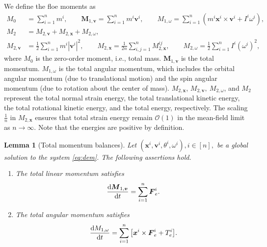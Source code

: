 \documentclass[a4paper,11pt]{article}
\numberwithin{equation}{section}
\newtheorem{lemma}[theorem]{Lemma}
\theoremstyle{definition}
\newcommand{\bfx}{\boldsymbol{x}}
\newcommand{\bfv}{\boldsymbol{v}}
\newcommand{\bfF}{\boldsymbol{F}}
\newcommand{\bfM}{\boldsymbol{M}}
\def\d{{  \rm d}}
\begin{document}
\noindent
We define the floe moments as
\begin{equation} \label{eq:Ms}
\begin{aligned}
    M_0 & = \sum_{i=1}^n m^i, \qquad \bfM_{1,\bfv} = \sum_{i=1}^n m^i \bfv^i, 
    \qquad M_{1,\omega} = \sum_{i=1}^n (m^i \bfx^i \times \bfv^i + I^i \omega^i), \\
    M_2 & = M_{2,\bfv} + M_{2,\bfx} + M_{2,\omega}, \\
    M_{2,\bfv} &= \frac{1}{2} \sum_{i=1}^n m^i | \bfv^i|^2, \qquad M_{2,\bfx} = \frac{1}{2n}\sum_{i,j=1}^n M_{2,\bfx}^{ij}, \qquad    M_{2,\omega}  = \frac{1}{2} \sum_{i=1}^n I^i (\omega^i)^2,
    \end{aligned}
\end{equation}
where $M_0$ is the zero-order moment, i.e., total mass. 
$\bfM_{1,\bfv} $ is the total momentum.
$M_{1,\omega}$ is the total angular momentum, which includes the orbital angular momentum (due to translational motion) and the spin angular momentum (due to rotation about the center of mass). 
$M_{2,\bfx}$,  $M_{2,\bfv},\ M_{2,\omega}$, and  $M_2$ represent the total normal strain energy, the total translational kinetic energy, the total rotational kinetic energy, and the total energy, respectively. 
The scaling $\frac{1}{n}$ in $M_{2,\bfx}$ ensures that total strain energy remain $\mathcal{O}(1)$ in the mean-field limit as $n\to \infty.$
Note that the energies are positive by definition.


\begin{lemma}[Total momentum balances] \label{lem:sumparticleMV}
Let $(\bfx^i, \bfv^i, \theta^i, \omega^i), i\in [n],$ be a global solution to the system \eqref{eq:dem}. The following assertions hold.
\begin{enumerate}
\item The total linear momentum satisfies
\begin{align}
\begin{aligned} \label{eq:dtM1v}
\frac{\d\bfM_{1,\bfv}}{\d t}  = \sum_{i=1}^{n} \bfF^i_e.
\end{aligned}
\end{align}

\item The total angular momentum satisfies
\begin{align}
\begin{aligned} \label{eq:dtM1w}
\frac{\d M_{1,\omega}}{\d t}  = \sum_{i=1}^{n} \big[ \bfx^i \times \bfF^i_e
      + T^i_e \big].
\end{aligned}
\end{align}
\end{enumerate}
\end{lemma}
\end{document}
